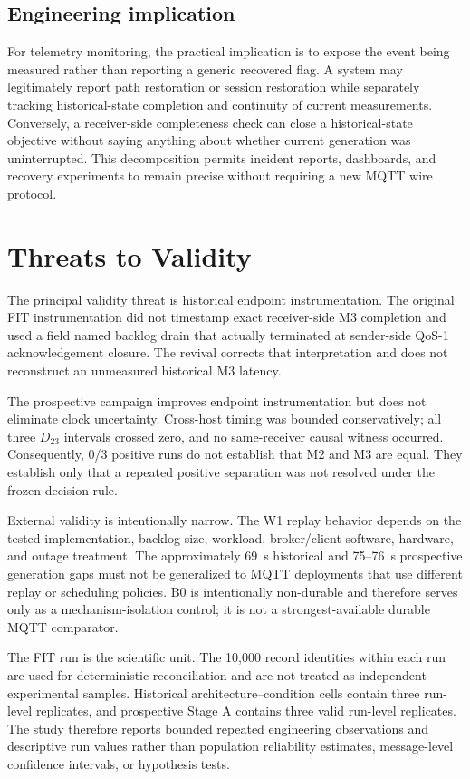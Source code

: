 \documentclass[journal]{IEEEtran}
\begin{document}
\subsection{Engineering implication}

For telemetry monitoring, the practical implication is to expose the event being measured rather than reporting a generic recovered flag. A system may legitimately report path restoration or session restoration while separately tracking historical-state completion and continuity of current measurements. Conversely, a receiver-side completeness check can close a historical-state objective without saying anything about whether current generation was uninterrupted. This decomposition permits incident reports, dashboards, and recovery experiments to remain precise without requiring a new MQTT wire protocol.

\section{Threats to Validity}
\label{sec:threats}

The principal validity threat is historical endpoint instrumentation. The original FIT instrumentation did not timestamp exact receiver-side M3 completion and used a field named backlog drain that actually terminated at sender-side QoS-1 acknowledgement closure. The revival corrects that interpretation and does not reconstruct an unmeasured historical M3 latency.

The prospective campaign improves endpoint instrumentation but does not eliminate clock uncertainty. Cross-host timing was bounded conservatively; all three $D_{23}$ intervals crossed zero, and no same-receiver causal witness occurred. Consequently, 0/3 positive runs do not establish that M2 and M3 are equal. They establish only that a repeated positive separation was not resolved under the frozen decision rule.

External validity is intentionally narrow. The W1 replay behavior depends on the tested implementation, backlog size, workload, broker/client software, hardware, and outage treatment. The approximately 69~s historical and 75--76~s prospective generation gaps must not be generalized to MQTT deployments that use different replay or scheduling policies. B0 is intentionally non-durable and therefore serves only as a mechanism-isolation control; it is not a strongest-available durable MQTT comparator.

The FIT run is the scientific unit. The 10,000 record identities within each run are used for deterministic reconciliation and are not treated as independent experimental samples. Historical architecture--condition cells contain three run-level replicates, and prospective Stage A contains three valid run-level replicates. The study therefore reports bounded repeated engineering observations and descriptive run values rather than population reliability estimates, message-level confidence intervals, or hypothesis tests.
\end{document}
